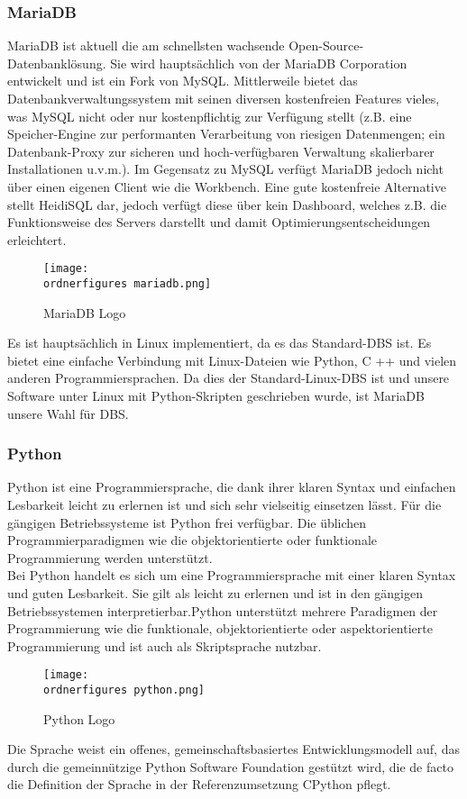 \subsubsection{MariaDB}
MariaDB ist aktuell die am schnellsten wachsende Open-Source-Datenbanklösung. Sie wird hauptsächlich von der MariaDB Corporation entwickelt und ist ein Fork von MySQL. Mittlerweile bietet das Datenbankverwaltungssystem mit seinen diversen kostenfreien Features vieles, was MySQL nicht oder nur kostenpflichtig zur Verfügung stellt (z.B. eine Speicher-Engine zur performanten Verarbeitung von riesigen Datenmengen; ein Datenbank-Proxy zur sicheren und hoch-verfügbaren Verwaltung skalierbarer Installationen u.v.m.). Im Gegensatz zu MySQL verfügt MariaDB jedoch nicht über einen eigenen Client wie die Workbench. Eine gute kostenfreie Alternative stellt HeidiSQL dar, jedoch verfügt diese über kein Dashboard, welches z.B. die Funktionsweise des Servers darstellt und damit Optimierungsentscheidungen erleichtert.\cite{MariaDB-Monitor}
\begin{figure}[h]
	\centering
	\texttt{[image: \\ordnerfigures mariadb.png]}
	\caption{ MariaDB Logo}
	\label{fig:mariadb}
	\cite{MariaDBlogo}
\end{figure}
\bigbreak
Es ist hauptsächlich in Linux implementiert, da es das Standard-DBS ist. Es bietet eine einfache Verbindung mit Linux-Dateien wie Python, C ++ und vielen anderen Programmiersprachen. Da dies der Standard-Linux-DBS ist und unsere Software unter Linux mit Python-Skripten geschrieben wurde, ist MariaDB unsere Wahl für DBS.

\subsubsection{Python}
Python ist eine Programmiersprache, die dank ihrer klaren Syntax und einfachen Lesbarkeit leicht zu erlernen ist und sich sehr vielseitig einsetzen lässt. Für die gängigen Betriebssysteme ist Python frei verfügbar. Die üblichen Programmierparadigmen wie die objektorientierte oder funktionale Programmierung werden unterstützt.\\
Bei Python handelt es sich um eine Programmiersprache mit einer klaren Syntax und guten Lesbarkeit. Sie gilt als leicht zu erlernen und ist in den gängigen Betriebssystemen interpretierbar.Python unterstützt mehrere Paradigmen der Programmierung wie die funktionale, objektorientierte oder aspektorientierte Programmierung und ist auch als Skriptsprache nutzbar.\cite{pythonInfo}
\begin{figure}[ht]
	\centering
	\texttt{[image: \\ordnerfigures python.png]}
	\caption{ Python Logo}
	\label{fig:python}
	\cite{Pythonlogo}
\end{figure}
 Die Sprache weist ein offenes, gemeinschaftsbasiertes Entwicklungsmodell auf, das durch die gemeinnützige Python Software Foundation gestützt wird, die de facto die Definition der Sprache in der Referenzumsetzung CPython pflegt.

